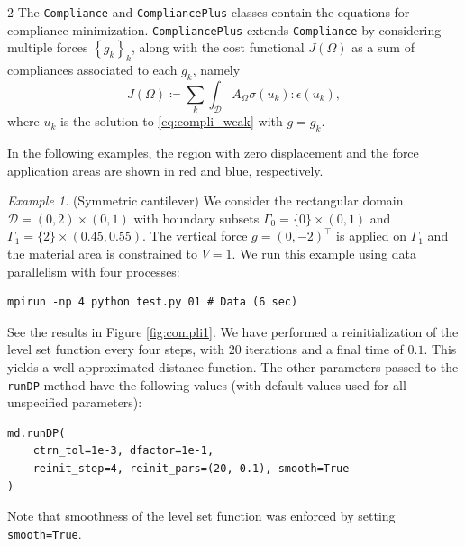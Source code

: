 \documentclass[a4paper, oneside]{article}
\newcommand{\code}[1]{\texttt{#1}}
\begin{document}
\begin{multicols}{2}
The \code{Compliance} and \code{CompliancePlus} classes
contain the equations for compliance minimization.
\code{CompliancePlus} extends \code{Compliance} by considering
multiple forces $\left\{g_k\right\}_k$, along with
the cost functional $J(\Omega)$ as a sum of compliances associated to each $g_k$, namely
\begin{equation} \label{eq:compli_plus}
	J(\Omega) \coloneqq \sum_{k} \int_{\mathcal{D}} A_{\Omega}\sigma(u_k):\epsilon(u_k),
\end{equation}
where $u_k$ is the solution to \eqref{eq:compli_weak} with $g=g_k$.

In the following examples, the region with zero displacement and
the force application areas are shown in red and blue, respectively.

\noindent\textit{Example 1.} (Symmetric cantilever)
We consider the rectangular domain $\mathcal{D} = (0, 2)\times(0, 1)$
with boundary subsets $\Gamma_0 = \{0\} \times (0, 1)$
and $\Gamma_1 = \{2\} \times (0.45,0.55)$.
The vertical force $g = (0, -2)^\top$ is applied on $\Gamma_1$ and
the material area is constrained to $V = 1$.
We run this example using data parallelism with four processes:
\begin{lstlisting}
mpirun -np 4 python test.py 01 # Data (6 sec)
\end{lstlisting}
See the results in Figure \ref{fig:compli1}. 
We have performed a reinitialization of the level set function
every four steps, with $20$ iterations and a final time of $0.1$.
This yields a well approximated distance function.
The other parameters passed to the \code{runDP} method
have the following values (with default values used for all unspecified parameters): 
\begin{lstlisting}
md.runDP(
	ctrn_tol=1e-3, dfactor=1e-1,
	reinit_step=4, reinit_pars=(20, 0.1), smooth=True
)
\end{lstlisting} 
Note that smoothness of the level set function was enforced by setting \code{smooth=True}.


\end{multicols}
\end{document}
